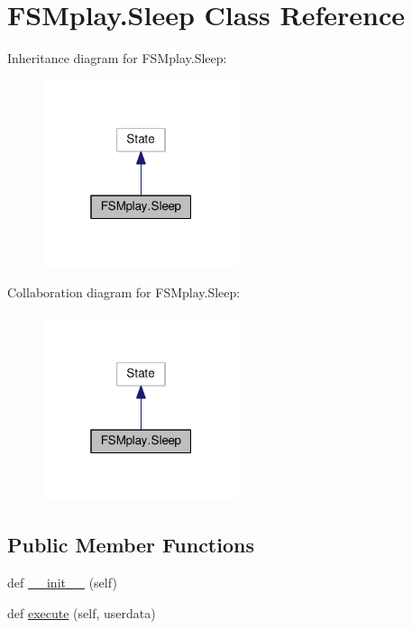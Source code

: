 \hypertarget{classFSMplay_1_1Sleep}{}\section{F\+S\+Mplay.\+Sleep Class Reference}
\label{classFSMplay_1_1Sleep}


Inheritance diagram for F\+S\+Mplay.\+Sleep\+:\nopagebreak
\begin{figure}[H]
\begin{center}
\leavevmode
\includegraphics[width=163pt]{classFSMplay_1_1Sleep__inherit__graph}
\end{center}
\end{figure}


Collaboration diagram for F\+S\+Mplay.\+Sleep\+:\nopagebreak
\begin{figure}[H]
\begin{center}
\leavevmode
\includegraphics[width=163pt]{classFSMplay_1_1Sleep__coll__graph}
\end{center}
\end{figure}
\subsection*{Public Member Functions}
\begin{DoxyCompactItemize}
\item 
def \hyperlink{classFSMplay_1_1Sleep_afccc38ee1eababdf0f39d5210d18f864}{\+\_\+\+\_\+init\+\_\+\+\_\+} (self)
\item 
def \hyperlink{classFSMplay_1_1Sleep_a39f49b7e0a6cbd4d453d2b9fb365d21c}{execute} (self, userdata)
\end{DoxyCompactItemize}
